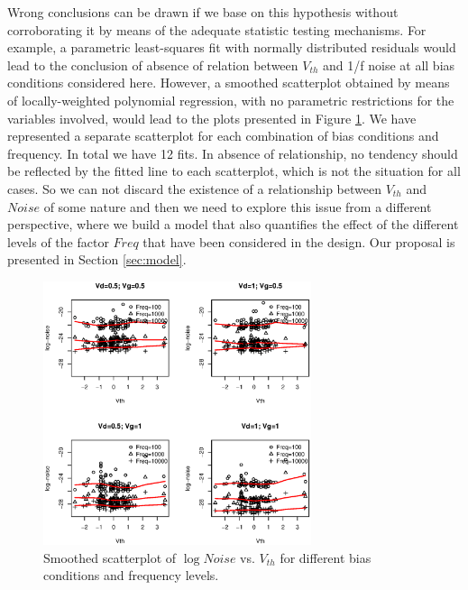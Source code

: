 \documentclass[sn-mathphys]{sn-jnl}%
\theoremstyle{thmstyleone}%
\theoremstyle{thmstyletwo}%
\theoremstyle{thmstylethree}%
\begin{document}
Wrong conclusions can be drawn if we base on this hypothesis without corroborating it by means of the adequate statistic testing mechanisms.
For example, a parametric least-squares fit with normally distributed residuals would lead to the conclusion of absence of relation between $V_{th}$ and 1/f noise at all bias conditions considered here. However, a smoothed scatterplot obtained by means of locally-weighted polynomial regression, with no parametric restrictions for the variables involved, would lead to the plots presented in Figure \ref{fig:lognoiseVSvth}. We have represented a separate scatterplot for each combination of bias conditions and frequency. In total we have 12 fits. In absence of relationship, no tendency should be reflected by the fitted line to each scatterplot, which is not the situation for all cases. So we can not discard the existence of a relationship between $V_{th}$ and $Noise$ of some nature and then we need to explore this issue from a different perspective, where we build a model that also quantifies the effect of the different levels of the factor $Freq$ that have been considered in the design. Our proposal is presented in Section \ref{sec:model}.


\begin{figure}[ht]
	\centerline{
		\includegraphics[width=0.7\textwidth]{Fig5_lognoiseVSvth.eps}}
	\caption{Smoothed scatterplot of $\log Noise$ vs. $V_{th}$ for different  bias conditions and frequency levels. }
	\label{fig:lognoiseVSvth}
\end{figure}


\end{document}
